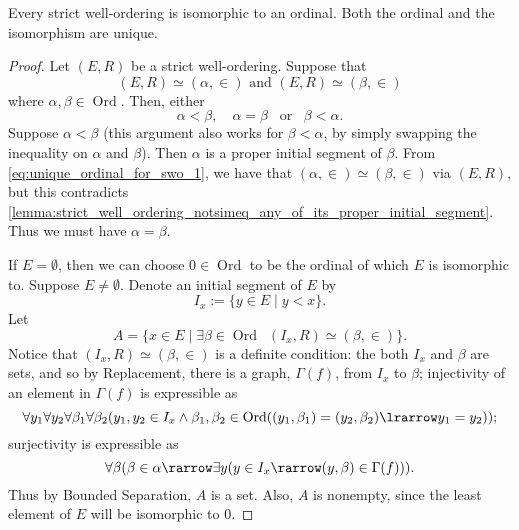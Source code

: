 \documentclass[notoc,notitlepage]{tufte-book}
\DeclareMathOperator{\Ord}{Ord }
\begin{document}
\begin{thm}
\label{thm:strict_well_ordered_sets_are_isomorphic_to_a_unique_ordinal}
  Every strict well-ordering is isomorphic to an ordinal. Both the ordinal and the isomorphism are unique.
\end{thm}

\begin{proof}

  Let $(E, R)$ be a strict well-ordering. Suppose that
  \begin{equation}\label{eq:unique_ordinal_for_swo_1}
    (E, R) \simeq (\alpha, \in) \text{ and } (E, R) \simeq (\beta, \in)
  \end{equation}
  where $\alpha, \beta \in \Ord$. Then, either
  \begin{equation*}
    \alpha < \beta, \quad \alpha = \beta \enspace \text{ or } \enspace \beta < \alpha.
  \end{equation*}
  Suppose $\alpha < \beta$ (this argument also works for $\beta < \alpha$, by simply swapping the inequality on $\alpha$ and $\beta$). Then $\alpha$ is a proper initial segment of $\beta$. From \cref{eq:unique_ordinal_for_swo_1}, we have that $(\alpha, \in) \simeq (\beta, \in)$ via $(E, R)$, but this contradicts \cref{lemma:strict_well_ordering_notsimeq_any_of_its_proper_initial_segment}. Thus we must have $\alpha = \beta$.

  \noindent{}

  If $E = \emptyset$, then we can choose $0 \in \Ord$ to be the ordinal of which $E$ is isomorphic to. Suppose $E \neq \emptyset$. Denote an initial segment of $E$ by
  \begin{equation*}
    I_x := \{ y \in E \mid y < x \}.
  \end{equation*}
  Let
  \begin{equation*}
    A = \{ x \in E \mid \exists \beta \in \Ord \enspace (I_x, R) \simeq (\beta, \in) \}.
  \end{equation*}
  Notice that $(I_x, R) \simeq (\beta, \in)$ is a definite condition: the both $I_x$ and $\beta$ are sets, and so by Replacement, there is a graph, $\Gamma(f)$, from $I_x$ to $\beta$; injectivity of an element in $\Gamma(f)$ is expressible as
  \begin{equation*}
    \forall y_1 \forall y_2 \forall \beta_1 \forall \beta_2 ( y_1, y_2 \in I_x \land \beta_1, \beta_2 \in \Ord ( (y_1, \beta_1) = (y_2, \beta_2) \lrarrow y_1 = y_2 ) );
  \end{equation*}
  surjectivity is expressible as
  \begin{equation*}
    \forall \beta ( \beta \in \alpha \rarrow \exists y ( y \in I_x \rarrow (y, \beta) \in \Gamma(f) ) ).
  \end{equation*}
  Thus by Bounded Separation, $A$ is a set. Also, $A$ is nonempty, since the least element of $E$ will be isomorphic to $0$.


\end{proof}
\end{document}
